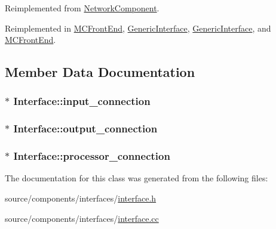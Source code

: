 Reimplemented from \hyperlink{classNetworkComponent_9bb9874e1f5705588cb3d9c201d8fc6f}{NetworkComponent}.

Reimplemented in \hyperlink{classMCFrontEnd_9dda980a7ae732e6cb6da7121bc4f539}{MCFrontEnd}, \hyperlink{classGenericInterface_ae1400fce0c7ba48965596ec172e474b}{GenericInterface}, \hyperlink{classGenericInterface_ae1400fce0c7ba48965596ec172e474b}{GenericInterface}, and \hyperlink{classMCFrontEnd_9dda980a7ae732e6cb6da7121bc4f539}{MCFrontEnd}.

\subsection{Member Data Documentation}
\hypertarget{classInterface_c14fb826229e323ebef2813f887ac37f}{
\subsubsection[{input\_\-connection}]{$\ast$ {\bf Interface::input\_\-connection}}}
\label{classInterface_c14fb826229e323ebef2813f887ac37f}


\hypertarget{classInterface_2fee13a07ffc4a43dd50892b22feca92}{
\subsubsection[{output\_\-connection}]{$\ast$ {\bf Interface::output\_\-connection}}}
\label{classInterface_2fee13a07ffc4a43dd50892b22feca92}


\hypertarget{classInterface_5008ad5bfdf390821d9b6de2272fbe6d}{
\subsubsection[{processor\_\-connection}]{$\ast$ {\bf Interface::processor\_\-connection}}}
\label{classInterface_5008ad5bfdf390821d9b6de2272fbe6d}




The documentation for this class was generated from the following files:\begin{CompactItemize}
\item 
source/components/interfaces/\hyperlink{interface_8h}{interface.h}\item 
source/components/interfaces/\hyperlink{interface_8cc}{interface.cc}\end{CompactItemize}

